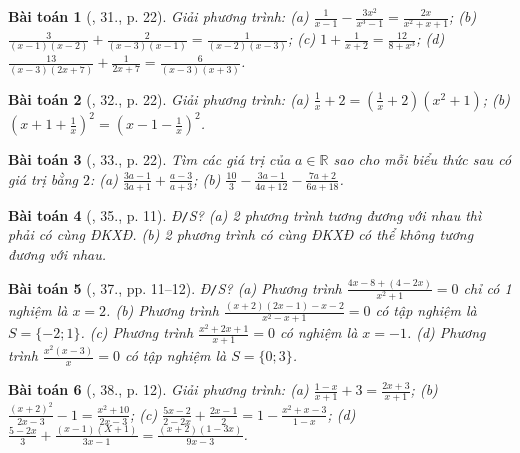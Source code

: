 \documentclass{article}
\newtheorem{baitoan}{Bài toán}
\begin{document}
\begin{baitoan}[\cite{SGK_Toan_8_tap_2}, 31., p. 22]
	Giải phương trình: (a) $\frac{1}{x - 1} - \frac{3x^2}{x^3 - 1} = \frac{2x}{x^2 + x + 1}$; (b) $\frac{3}{(x - 1)(x - 2)} + \frac{2}{(x - 3)(x - 1)} = \frac{1}{(x - 2)(x - 3)}$; (c) $1 + \frac{1}{x + 2} = \frac{12}{8 + x^3}$; (d) $\frac{13}{(x - 3)(2x + 7)} + \frac{1}{2x + 7} = \frac{6}{(x - 3)(x + 3)}$.
\end{baitoan}

\begin{baitoan}[\cite{SGK_Toan_8_tap_2}, 32., p. 22]
	Giải phương trình: (a) $\frac{1}{x} + 2 = \left(\frac{1}{x} + 2\right)(x^2 + 1)$; (b) $\left(x + 1 + \frac{1}{x}\right)^2 = \left(x - 1 - \frac{1}{x}\right)^2$.
\end{baitoan}

\begin{baitoan}[\cite{SGK_Toan_8_tap_2}, 33., p. 22]
	Tìm các giá trị của $a\in\mathbb{R}$ sao cho mỗi biểu thức sau có giá trị bằng $2$: (a) $\frac{3a - 1}{3a + 1} + \frac{a - 3}{a + 3}$; (b) $\frac{10}{3} - \frac{3a - 1}{4a + 12} - \frac{7a + 2}{6a + 18}$.
\end{baitoan}

\begin{baitoan}[\cite{SBT_Toan_8_tap_2}, 35., p. 11]
	\emph{Đ\texttt{/}S?} (a) 2 phương trình tương đương với nhau thì phải có cùng ĐKXĐ. (b) 2 phương trình có cùng ĐKXĐ có thể không tương đương với nhau.
\end{baitoan}

\begin{baitoan}[\cite{SBT_Toan_8_tap_2}, 37., pp. 11--12]
	\emph{Đ\texttt{/}S?} (a) Phương trình $\frac{4x - 8 + (4 - 2x)}{x^2 + 1} = 0$ chỉ có 1 nghiệm là $x = 2$. (b) Phương trình $\frac{(x + 2)(2x - 1) - x - 2}{x^2 - x + 1} = 0$ có tập nghiệm là $S = \{-2;1\}$. (c) Phương trình $\frac{x^2 + 2x + 1}{x + 1} = 0$ có nghiệm là $x = -1$. (d) Phương trình $\frac{x^2(x - 3)}{x} = 0$ có tập nghiệm là $S = \{0;3\}$.
\end{baitoan}

\begin{baitoan}[\cite{SBT_Toan_8_tap_2}, 38., p. 12]
	Giải phương trình: (a) $\frac{1 - x}{x + 1} + 3 = \frac{2x + 3}{x + 1}$; (b) $\frac{(x + 2)^2}{2x - 3} - 1 = \frac{x^2 + 10}{2x - 3}$; (c) $\frac{5x - 2}{2 - 2x} + \frac{2x - 1}{2} = 1 - \frac{x^2 + x - 3}{1 - x}$; (d) $\frac{5 - 2x}{3} + \frac{(x - 1)(X + 1)}{3x - 1} = \frac{(x + 2)(1 - 3x)}{9x - 3}$.
\end{baitoan}
\end{document}

